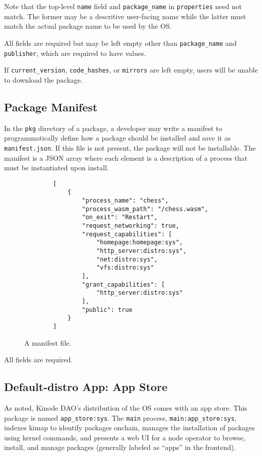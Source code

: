 \documentclass[runningheads]{llncs}
\begin{document}
Note that the top-level \verb|name| field and \verb|package_name| in \verb|properties| need not match. The former may be a descritive user-facing name while the latter must match the actual package name to be used by the OS.

All fields are required but may be left empty other than \verb|package_name| and \verb|publisher|, which are required to have values.

If \verb|current_version|, \verb|code_hashes|, or \verb|mirrors| are left empty, users will be unable to download the package.

\subsection{Package Manifest}
\label{sec:packagemanagermanifest}

In the \verb|pkg| directory of a package, a developer may write a manifest to programmatically define how a package should be installed and save it as \verb|manifest.json|.
If this file is not present, the package will not be installable.
The manifest is a JSON array where each element is a description of a process that must be instantiated upon install.

\begin{figure}[H]
    \centering
    \begin{lstlisting}
        [
            {
                "process_name": "chess",
                "process_wasm_path": "/chess.wasm",
                "on_exit": "Restart",
                "request_networking": true,
                "request_capabilities": [
                    "homepage:homepage:sys",
                    "http_server:distro:sys",
                    "net:distro:sys",
                    "vfs:distro:sys"
                ],
                "grant_capabilities": [
                    "http_server:distro:sys"
                ],
                "public": true
            }
        ]
    \end{lstlisting}
    \caption{A manifest file.}
    \label{fig:example manifest.json}
\end{figure}

All fields are required.%

\subsection{Default-distro App: App Store}
\label{sec:appstore}

As noted, Kinode DAO's distribution of the OS comes with an app store.
This package is named \verb|app_store:sys|.
The \verb|main| process, \verb|main:app_store:sys|, indexes kimap to identify packages onchain, manages the installation of packages using kernel commands, and presents a web UI for a node operator to browse, install, and manage packages (generally labeled as ``apps'' in the frontend).
\end{document}
